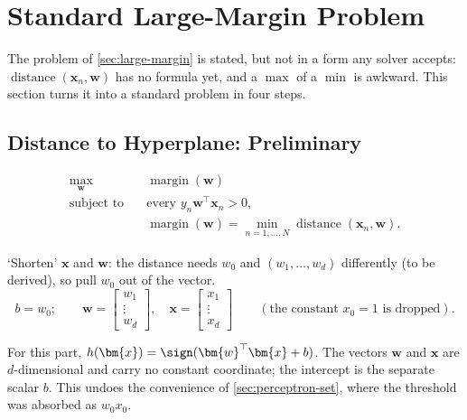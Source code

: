 \section{Standard Large-Margin Problem}\label{sec:standard-lm}


The problem of \autoref{sec:large-margin} is stated, but not in a form any
solver accepts: \(\operatorname{distance}(\bm{x}_n, \bm{w})\) has no formula
yet, and a \(\max\) of a \(\min\) is awkward. This section turns it into a
standard problem in four steps.

\subsection{Distance to Hyperplane: Preliminary}

\[
    \begin{aligned}
        \max_{\bm{w}} \quad & \operatorname{margin}(\bm{w})\\
        \text{subject to} \quad & \text{every } y_n \bm{w}^\top \bm{x}_n >
            0,\\
        & \operatorname{margin}(\bm{w}) = \min_{n=1,\dots,N}
            \operatorname{distance}(\bm{x}_n, \bm{w}).
    \end{aligned}
\]

`Shorten' \(\bm{x}\) and \(\bm{w}\): the distance needs \(w_0\) and
\((w_1, \dots , w_d)\) differently (to be derived), so pull \(w_0\) out of
the vector.
\[
    b = w_0; \qquad
    \bm{w} = \begin{bmatrix} w_1 \\ \vdots \\ w_d \end{bmatrix}, \quad
    \bm{x} = \begin{bmatrix} x_1 \\ \vdots \\ x_d \end{bmatrix}
    \qquad (\text{the constant } x_0 = 1 \text{ is dropped}).
\]

\begin{notation}
    For this part, \(h(\bm{x}) = \sign(\bm{w}^\top \bm{x} + b)\). The vectors
    \(\bm{w}\) and \(\bm{x}\) are \(d\)-dimensional and carry no constant
    coordinate; the intercept is the separate scalar \(b\). This undoes the
    convenience of \autoref{sec:perceptron-set}, where the threshold was
    absorbed as \(w_0 x_0\).
\end{notation}

